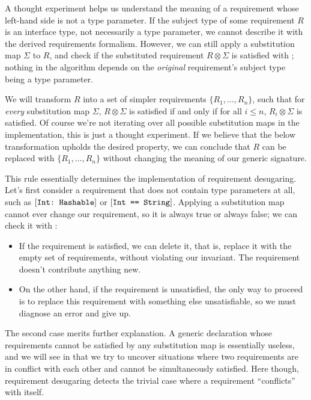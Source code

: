\documentclass[../generics]{subfiles}
\begin{document}
A thought experiment helps us understand the meaning of a requirement whose left-hand side is not a type parameter. If the subject type of some requirement $R$ is an interface type, not necessarily a type parameter, we cannot describe it with the derived requirements formalism. However, we can still apply a substitution map $\Sigma$ to $R$, and check if the substituted requirement $R\otimes\Sigma$ is satisfied with ; nothing in the algorithm depends on the \emph{original} requirement's subject type being a type parameter.

We will transform $R$ into a set of simpler requirements $\{R_1,\ldots,R_n\}$, such that for \emph{every} substitution map $\Sigma$, $R\otimes\Sigma$ is satisfied if and only if for all $i\le n$, $R_i\otimes\Sigma$ is satisfied. Of course we're not iterating over all possible substitution maps in the implementation, this is just a thought experiment. If we believe that the below transformation upholds the desired property, we can conclude that $R$ can be replaced with $\{R_1,\ldots,R_n\}$ without changing the meaning of our generic signature.

This rule essentially determines the implementation of requirement desugaring. Let's first consider a requirement that does not contain type parameters at all, such as $[\texttt{Int:~Hashable}]$ or $[\texttt{Int == String}]$. Applying a substitution map cannot ever change our requirement, so it is always true or always false; we can check it with :
\begin{itemize}
\item If the requirement is satisfied, we can delete it, that is, replace it with the empty set of requirements, without violating our invariant. The requirement doesn't contribute anything new.
\item On the other hand, if the requirement is unsatisfied, the only way to proceed is to replace this requirement with something else unsatisfiable, so we must diagnose an error and give up.
\end{itemize}
The second case merits further explanation. A generic declaration whose requirements cannot be satisfied by any substitution map is essentially useless, and we will see in  that we try to uncover situations where two requirements are in conflict with each other and cannot be simultaneously satisfied. Here though, requirement desugaring detects the trivial case where a requirement ``conflicts'' with itself.
\end{document}
